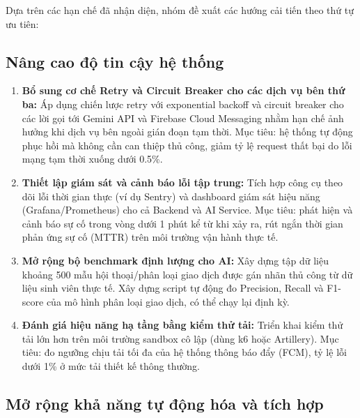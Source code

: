 Dựa trên các hạn chế đã nhận diện, nhóm đề xuất các hướng cải tiến theo thứ tự ưu tiên:

\subsection{Nâng cao độ tin cậy hệ thống}

\begin{enumerate}
    \item \textbf{Bổ sung cơ chế Retry và Circuit Breaker cho các dịch vụ bên thứ ba:} Áp dụng chiến lược retry với exponential backoff và circuit breaker cho các lời gọi tới Gemini API và Firebase Cloud Messaging nhằm hạn chế ảnh hưởng khi dịch vụ bên ngoài gián đoạn tạm thời. Mục tiêu: hệ thống tự động phục hồi mà không cần can thiệp thủ công, giảm tỷ lệ request thất bại do lỗi mạng tạm thời xuống dưới 0.5\%.

    \item \textbf{Thiết lập giám sát và cảnh báo lỗi tập trung:} Tích hợp công cụ theo dõi lỗi thời gian thực (ví dụ Sentry) và dashboard giám sát hiệu năng (Grafana/Prometheus) cho cả Backend và AI Service. Mục tiêu: phát hiện và cảnh báo sự cố trong vòng dưới 1 phút kể từ khi xảy ra, rút ngắn thời gian phản ứng sự cố (MTTR) trên môi trường vận hành thực tế.

    \item \textbf{Mở rộng bộ benchmark định lượng cho AI:} Xây dựng tập dữ liệu khoảng 500 mẫu hội thoại/phân loại giao dịch được gán nhãn thủ công từ dữ liệu sinh viên thực tế. Xây dựng script tự động đo Precision, Recall và F1-score của mô hình phân loại giao dịch, có thể chạy lại định kỳ.

    \item \textbf{Đánh giá hiệu năng hạ tầng bằng kiểm thử tải:} Triển khai kiểm thử tải lớn hơn trên môi trường sandbox cô lập (dùng k6 hoặc Artillery). Mục tiêu: đo ngưỡng chịu tải tối đa của hệ thống thông báo đẩy (FCM), tỷ lệ lỗi dưới 1\% ở mức tải thiết kế thông thường.
\end{enumerate}

\subsection{Mở rộng khả năng tự động hóa và tích hợp}

